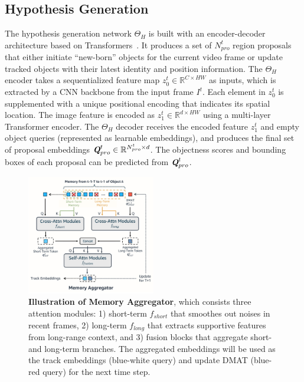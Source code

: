 \subsection{Hypothesis Generation}
\label{sec:method:theta_H}

The hypothesis generation network $\Theta_H$ is built with an encoder-decoder architecture based on Transformers~\cite{carion2020end,zhu2020deformable}.
It produces a set of $N^t_{pro}$ region proposals that either initiate ``new-born'' objects for the current video frame or update tracked objects with their latest identity and position information.
The $\Theta_H$ encoder takes a sequentialized feature map $z_0^t \in \mathbb{R}^{C \times HW}$ as inputs, which is extracted by a CNN backbone from the input frame $I^t$.
Each element in $z_0^t$ is supplemented with a unique positional encoding that indicates its spatial location.
The image feature is encoded as $z_1^t \in \mathbb{R}^{d \times HW}$ using a multi-layer Transformer encoder.
The $\Theta_H$ decoder receives the encoded feature $z_1^t$ and empty object queries (represented as learnable embeddings), and produces the final set of proposal embeddings $\textbf{\em Q}_{pro}^t \in \mathbb{R}^{N_{pro}^t \times d} $.
The objectness scores and bounding boxes of each proposal can be predicted from $\textbf{\em Q}_{pro}^t$.

\begin{figure}
    \centering
    \includegraphics[width=0.5\textwidth]{figures/memory_module.pdf}
    \vspace{-7.5mm}
    \caption{
        \textbf{Illustration of Memory Aggregator}, which consists three attention modules: 1) short-term $f_{short}$ that smoothes out noises in recent frames, 2) long-term $f_{long}$ that extracts supportive features from long-range context, and 3) fusion blocks that aggregate short- and long-term branches. The aggregated embeddings will be used as the track embeddings (blue-white query) and update DMAT (blue-red query) for the next time step.
    }
    \label{fig:ta}
    \vspace{-4.5mm}
\end{figure}

